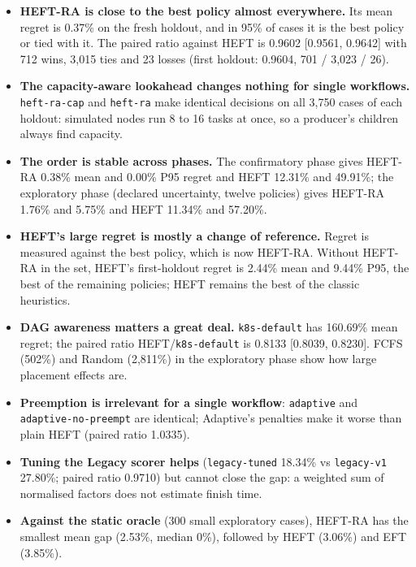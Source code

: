 \documentclass[12pt,a4paper]{report}
\newcommand{\pol}[1]{\texttt{#1}}
\begin{document}
\begin{itemize}
\item \textbf{HEFT-RA is close to the best policy almost everywhere.} Its
      mean regret is 0.37\% on the fresh holdout, and in 95\% of cases it
      is the best policy or tied with it. The paired ratio against HEFT is
      0.9602 [0.9561, 0.9642] with 712 wins, 3,015 ties and 23 losses
      (first holdout: 0.9604, 701 / 3,023 / 26).
\item \textbf{The capacity-aware lookahead changes nothing for single
      workflows.} \pol{heft-ra-cap} and \pol{heft-ra} make identical
      decisions on all 3,750 cases of each holdout: simulated nodes run 8
      to 16 tasks at once, so a producer's children always find capacity.
\item \textbf{The order is stable across phases.} The confirmatory phase
      gives HEFT-RA 0.38\% mean and 0.00\% P95 regret and HEFT 12.31\% and
      49.91\%; the exploratory phase (declared uncertainty, twelve
      policies) gives HEFT-RA 1.76\% and 5.75\% and HEFT 11.34\% and
      57.20\%.
\item \textbf{HEFT's large regret is mostly a change of reference.} Regret
      is measured against the best policy, which is now HEFT-RA. Without
      HEFT-RA in the set, HEFT's first-holdout regret is 2.44\% mean and
      9.44\% P95, the best of the remaining policies; HEFT remains the best
      of the classic heuristics.
\item \textbf{DAG awareness matters a great deal.} \pol{k8s-default} has
      160.69\% mean regret; the paired ratio HEFT/\pol{k8s-default} is
      0.8133 [0.8039, 0.8230]. FCFS (502\%) and Random (2,811\%) in the
      exploratory phase show how large placement effects are.
\item \textbf{Preemption is irrelevant for a single workflow}:
      \pol{adaptive} and \pol{adaptive-no-preempt} are identical; Adaptive's
      penalties make it worse than plain HEFT (paired ratio 1.0335).
\item \textbf{Tuning the Legacy scorer helps} (\pol{legacy-tuned} 18.34\%
      vs \pol{legacy-v1} 27.80\%; paired ratio 0.9710) but cannot close the
      gap: a weighted sum of normalised factors does not estimate finish
      time.
\item \textbf{Against the static oracle} (300 small exploratory cases),
      HEFT-RA has the smallest mean gap (2.53\%, median 0\%), followed by
      HEFT (3.06\%) and EFT (3.85\%).
\end{itemize}
\end{document}
